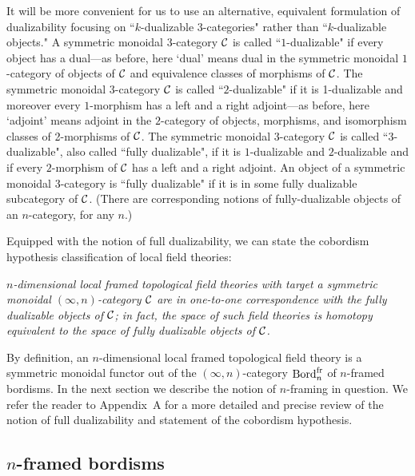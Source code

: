 \documentclass{amsart}
\begin{document}
It will be more convenient for us to use an alternative, equivalent formulation of dualizability focusing on ``$k$-dualizable $3$-categories" rather than ``$k$-dualizable objects."  A symmetric monoidal $3$-category $\mathcal C$ is called ``$1$-dualizable" if every object has a dual---as before, here `dual' means dual in the symmetric monoidal $1$-category of objects of $\mathcal C$ and equivalence classes of morphisms of $\mathcal C$.  The symmetric monoidal $3$-category $\mathcal C$ is called ``$2$-dualizable" if it is 1-dualizable and moreover every $1$-morphism has a left and a right adjoint---as before, here `adjoint' means adjoint in the $2$-category of objects, morphisms, and isomorphism classes of 2-morphisms of $\mathcal C$.  The symmetric monoidal $3$-category $\mathcal C$ is called ``$3$-dualizable", also called ``fully dualizable", if it is $1$-dualizable and $2$-dualizable and if every $2$-morphism of $\mathcal C$ has a left and a right adjoint.  An object of a symmetric monoidal $3$-category is ``fully dualizable" if it is in some fully dualizable subcategory of $\mathcal C$.  %
(There are corresponding notions of fully-dualizable objects of an $n$-category, for any $n$.)

Equipped with the notion of full dualizability, we can state the cobordism hypothesis classification of local field theories: \vspace{7pt}

\setlength{\leftskip}{.75cm}

 \emph{$n$-dimensional local framed topological field theories with target a symmetric monoidal $(\infty,n)$-category $\mathcal C$ are in one-to-one correspondence with the fully dualizable objects of $\mathcal C$; in fact, the space of such field theories is homotopy equivalent to the space of fully dualizable objects of $\mathcal C$.} \vspace{7pt}

\setlength{\leftskip}{0cm}

\nid By definition, an $n$-dimensional local framed topological field theory is a symmetric monoidal functor out of the $(\infty,n)$-category $\mathrm{Bord}^\mathrm{fr}_n$ of $n$-framed bordisms.  In the next section we describe the notion of $n$-framing in question.  We refer the reader to Appendix~A for a more detailed and precise review of the notion of full dualizability and statement of the cobordism hypothesis.  

\subsection{$n$-framed bordisms} \label{sec:notation}
\end{document}
